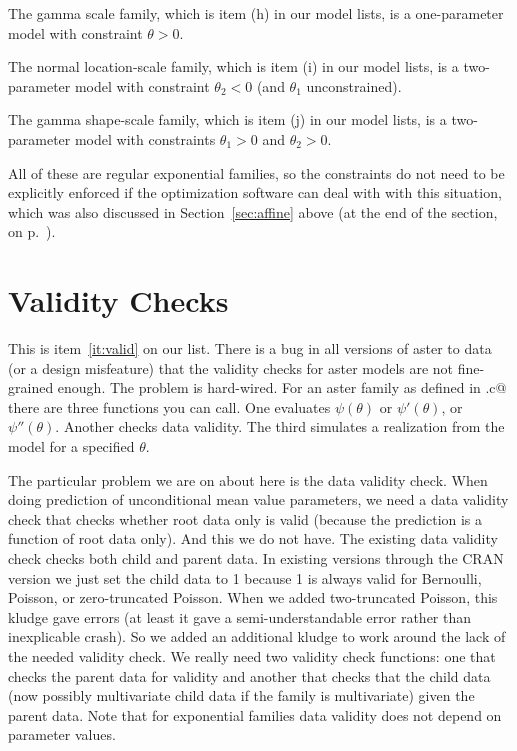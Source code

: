 \documentclass[11pt]{article}
\begin{document}
The gamma scale family, which is item (h) in our model lists,
is a one-parameter model with constraint $\theta > 0$.

The normal location-scale family, which is item (i) in our model lists,
is a two-parameter model with constraint $\theta_2 < 0$
(and $\theta_1$ unconstrained).

The gamma shape-scale family, which is item (j) in our model lists,
is a two-parameter model with constraints $\theta_1 > 0$ and $\theta_2 > 0$.

All of these are regular exponential families, so the constraints do
not need to be explicitly enforced if the optimization software can
deal with with this situation, which was also discussed
in Section~\ref{sec:affine} above (at the end of the section,
on p.~\pageref{pg:regular}).

\section{Validity Checks} \label{sec:valid}

This is item~\ref{it:valid} on our list.
There is a bug in all versions of aster to data (or a design misfeature)
that the validity checks for aster models are not fine-grained enough.
The problem is hard-wired.  For an aster family as defined in
\verb@astfam.c@ there are three functions you can call.
One evaluates $\psi(\theta)$ or $\psi'(\theta)$, or $\psi''(\theta)$.
Another checks data validity.
The third simulates a realization from the model for a specified $\theta$.

The particular problem we are on about here is the data validity check.
When doing prediction of unconditional mean value parameters, we need
a data validity check that checks whether root data only is valid
(because the prediction is a function of root data only).
And this we do not have.  The existing data validity check checks both
child and parent data.  In existing versions through the CRAN version
we just set the child data to 1 because 1 is always valid for Bernoulli,
Poisson, or zero-truncated Poisson.  When we added two-truncated Poisson,
this kludge gave errors (at least it gave a semi-understandable error
rather than inexplicable crash).
So we added an additional kludge to work around
the lack of the needed validity check.  We really need two validity check
functions: one that checks the parent data for validity and another
that checks that the child data (now possibly multivariate child data
if the family is multivariate) given the parent data.
Note that for exponential families data validity does not depend on
parameter values.
\end{document}
